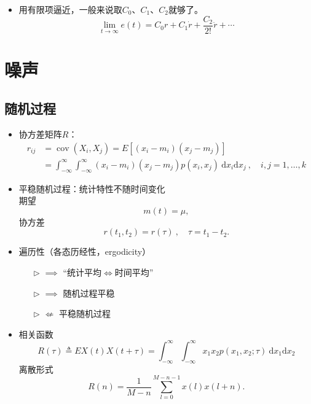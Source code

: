 \documentclass[14pt,a4paper]{article}
\theoremstyle{plain}
\theoremstyle{definition}
\theoremstyle{remark}
\theoremstyle{plain}
\theoremstyle{plain}
\theoremstyle{definition}
\begin{document}
				\begin{itemize}
					\item 用有限项逼近，一般来说取$C_0$、$C_1$、$C_2$就够了。
						\[
							\lim_{t \to \infty} e(t) = C_0 r + C_1 \dot r + \dfrac{C_2}{2!} \ddot r + \cdots 
						\]
				\end{itemize}  	
			
	\newpage
	\section{噪声}%
	\label{sec:噪声}
	
		\subsection{随机过程}%
		\label{sub:随机过程}
		
		\begin{itemize}
			\item 协方差矩阵$R$：
				\[
					\begin{split}
						r_{ij} &= \mathop{\text{cov}} \left( X_{i}, X_{j} \right) = E \left[ (x_{i}-m_{i})(x_{j}-m_{j}) \right] \\ 
							   &= \int_{-\infty}^\infty \int_{-\infty}^\infty (x_{i}-m_{i})(x_{j}-m_{j}) p(x_{i},x_{j}) \ \mathrm dx_{i} \mathrm d x_{j}\ , \quad i,j=1,\ldots ,k
					\end{split}	
				\] 
			\item 平稳随机过程：统计特性不随时间变化 \\
				期望
				\[
					m(t) = \mu
				,\]
				协方差
				\[
					r(t_1,t_2) = r(\tau)\ , \quad \tau = t_1-t_2
				.\] 
			\item 遍历性（各态历经性，ergodicity）
				\begin{itemize}
					\item[$\triangleright$]  $\implies$ ``统计平均$\Longleftrightarrow$时间平均''
					\item[$\triangleright$]  $\implies$ 随机过程平稳 
					\item[$\triangleright$]  $\not\Longleftarrow$ 平稳随机过程 
				\end{itemize}  
			\item 相关函数
				\[
					R(\tau) \triangleq E X(t) X(t+\tau) = \int_{-\infty}^\infty \int_{-\infty}^\infty x_1 x_2 p(x_1,x_2;\tau) \ \mathrm dx_1 \mathrm dx_2
				\]
				离散形式
				\[
					R(n) = \dfrac{1}{M-n} \sum_{l=0}^{M-n-1} x(l) x(l+n)
				.\] 
		\end{itemize} 
	
\end{document}
